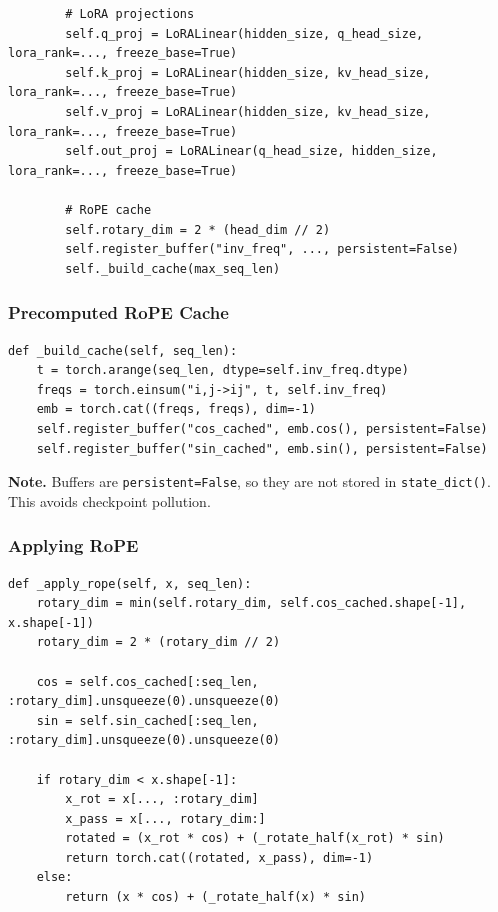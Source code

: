 {\begin{lstlisting}
        # LoRA projections
        self.q_proj = LoRALinear(hidden_size, q_head_size, lora_rank=..., freeze_base=True)
        self.k_proj = LoRALinear(hidden_size, kv_head_size, lora_rank=..., freeze_base=True)
        self.v_proj = LoRALinear(hidden_size, kv_head_size, lora_rank=..., freeze_base=True)
        self.out_proj = LoRALinear(q_head_size, hidden_size, lora_rank=..., freeze_base=True)
        
        # RoPE cache
        self.rotary_dim = 2 * (head_dim // 2)
        self.register_buffer("inv_freq", ..., persistent=False)
        self._build_cache(max_seq_len)
\end{lstlisting}

\subsubsection{Precomputed RoPE Cache}

\begin{lstlisting}
def _build_cache(self, seq_len):
    t = torch.arange(seq_len, dtype=self.inv_freq.dtype)
    freqs = torch.einsum("i,j->ij", t, self.inv_freq)
    emb = torch.cat((freqs, freqs), dim=-1)
    self.register_buffer("cos_cached", emb.cos(), persistent=False)
    self.register_buffer("sin_cached", emb.sin(), persistent=False)
\end{lstlisting}

\textbf{Note.} Buffers are \texttt{persistent=False}, so they are not stored in 
\texttt{state\_dict()}. This avoids checkpoint pollution.

\subsubsection{Applying RoPE}

\begin{lstlisting}
def _apply_rope(self, x, seq_len):
    rotary_dim = min(self.rotary_dim, self.cos_cached.shape[-1], x.shape[-1])
    rotary_dim = 2 * (rotary_dim // 2)
    
    cos = self.cos_cached[:seq_len, :rotary_dim].unsqueeze(0).unsqueeze(0)
    sin = self.sin_cached[:seq_len, :rotary_dim].unsqueeze(0).unsqueeze(0)
    
    if rotary_dim < x.shape[-1]:
        x_rot = x[..., :rotary_dim]
        x_pass = x[..., rotary_dim:]
        rotated = (x_rot * cos) + (_rotate_half(x_rot) * sin)
        return torch.cat((rotated, x_pass), dim=-1)
    else:
        return (x * cos) + (_rotate_half(x) * sin)
\end{lstlisting}

}
